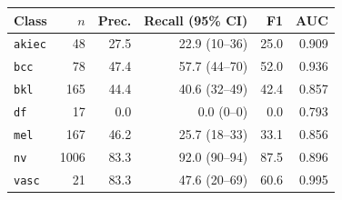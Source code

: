 \begin{tabular}{lrrrrr}
\toprule
Class & $n$ & Prec. & Recall (95\% CI) & F1 & AUC \\
\midrule
\texttt{akiec} & 48 & 27.5 & 22.9 (10--36) & 25.0 & 0.909 \\
\texttt{bcc} & 78 & 47.4 & 57.7 (44--70) & 52.0 & 0.936 \\
\texttt{bkl} & 165 & 44.4 & 40.6 (32--49) & 42.4 & 0.857 \\
\texttt{df} & 17 & 0.0 & 0.0 (0--0) & 0.0 & 0.793 \\
\texttt{mel} & 167 & 46.2 & 25.7 (18--33) & 33.1 & 0.856 \\
\texttt{nv} & 1006 & 83.3 & 92.0 (90--94) & 87.5 & 0.896 \\
\texttt{vasc} & 21 & 83.3 & 47.6 (20--69) & 60.6 & 0.995 \\
\bottomrule
\end{tabular}
